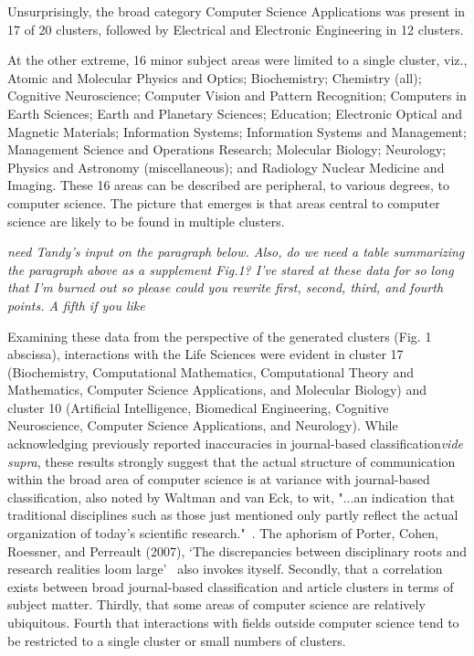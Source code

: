 Unsurprisingly, the broad category Computer Science Applications was present in 17 of 20 clusters, followed by  Electrical and Electronic Engineering in 12 clusters. 

At the other extreme, 16 minor subject areas were limited to a single cluster, viz.,
Atomic and Molecular Physics and Optics; 
Biochemistry; 
Chemistry (all); 
Cognitive Neuroscience; 
Computer Vision and Pattern Recognition;
Computers in Earth Sciences;
Earth and Planetary Sciences; 
Education; 
Electronic Optical and Magnetic Materials; 
Information Systems; 
Information Systems and Management;  
Management Science and Operations Research;
Molecular Biology;
Neurology; 
Physics and Astronomy (miscellaneous); 
and Radiology Nuclear Medicine and Imaging. These 16 areas can be described are peripheral, to various degrees, to computer science. The picture that emerges is that areas central to computer science are likely to be found in multiple clusters. 

\color{blue} \emph{need Tandy's input on the paragraph below. Also, do we need a table summarizing the paragraph above as a supplement Fig.1? I've stared at these data for so long that I'm burned out so please could you rewrite first, second, third, and fourth points. A fifth if you like} \color{black}

Examining these data from the perspective of the generated clusters (Fig. 1 abscissa), interactions with the Life Sciences were evident in cluster 17 (Biochemistry, Computational Mathematics, Computational Theory and Mathematics, Computer Science Applications, and Molecular Biology) and cluster 10 (Artificial Intelligence, Biomedical Engineering, Cognitive Neuroscience, Computer Science Applications, and Neurology). While acknowledging previously reported inaccuracies in journal-based classification\emph{vide supra}, these results strongly suggest that the actual structure of communication within the broad area of computer science is at variance with journal-based classification, also noted by Waltman and van Eck, to wit, "...an indication that traditional disciplines such as those just mentioned only partly reflect the actual organization of today’s scientific research."~\cite{waltman_new_2012}. The aphorism of Porter, Cohen, Roessner, and Perreault (2007), `The discrepancies between disciplinary roots and research realities loom large'~\cite{porter_measuring_2007} also invokes ityself. Secondly, that a correlation exists between broad journal-based classification and article clusters in terms of subject matter. Thirdly, that some areas of computer science are relatively ubiquitous. Fourth that interactions with fields outside computer science tend to be restricted to a single cluster or small numbers of clusters. 


